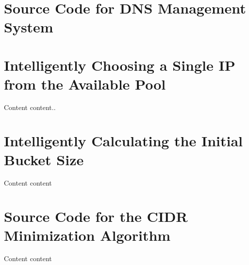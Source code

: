 \begin{appendices}

\chapter{Source Code for DNS Management System}
\label{appendix:dnsManagement}






\chapter{Intelligently Choosing a Single IP from the Available Pool}
\label{appendix:smartSingleIP}
Content content..

\chapter{Intelligently Calculating the Initial Bucket Size}
\label{appendix:smartInitBucket}
Content content

\chapter{Source Code for the CIDR Minimization Algorithm}
\label{appendix:algSourceCode}
Content content



\end{appendices}